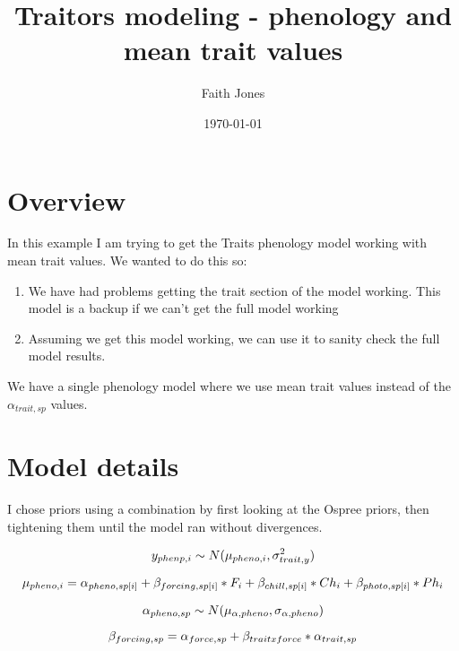 \documentclass{article}
\begin{document}



\title{Traitors modeling - phenology and mean trait values}
\author{Faith Jones}
\date{\today}
\maketitle 

\section{Overview}
In this example I am trying to get the Traits phenology model working with mean trait values. We wanted to do this so:
\begin{enumerate}
	\item We have had problems getting the trait section of the model working. This model is a backup if we can't get the full model working
	\item Assuming we get this model working, we can use it to sanity check the full model results.
\end{enumerate}

We have a single phenology model where we use mean trait values instead of the $\alpha_{trait,sp}$ values.

\section{Model details}
I chose priors using a combination by first looking at the Ospree priors, then tightening them until the model ran without divergences. 

\begin{equation}
y_{phenp,i} \sim N(\mu_{pheno, i},\sigma^2_{trait, y})\\
\end{equation}

\begin{equation}
\mu_{pheno, i} = \alpha_{pheno,sp[i]} + \beta_{forcing,sp[i]}*F_i + \beta_{chill,sp[i]}*Ch_i+ \beta_{photo,sp[i]}*Ph_i\\
\end{equation}

\begin{equation}
\alpha_{pheno,sp} \sim N(\mu_{\alpha, pheno}, \sigma_{\alpha, pheno})\\
\end{equation}


\begin{equation}
\beta_{forcing,sp} = \alpha_{force,sp} + \beta_{trait x force}*\alpha_{trait, sp} \\
\end{equation}
\end{document}
